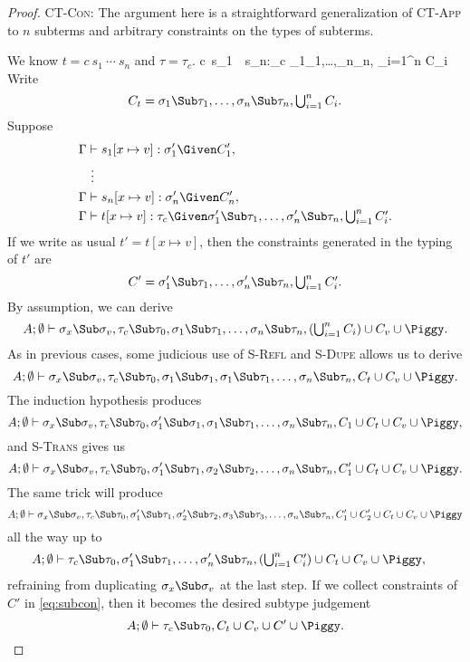 \documentclass{amsart}
\theoremstyle{definition}
\begin{document}
\begin{proof}
\Case\textsc{CT-Con}: The argument here is a straightforward
generalization of \hbox{\textsc{CT-App}} to $n$ subterms and
arbitrary constraints on the types of subterms.

We know $t=c~s_1~\cdots~s_n$ and $\tau=\tau_c$.
%
{\Gamma\vdash c~s_1~\cdots~s_n:\tau_c\Given
\sigma_1\Sub\tau_1,\ldots,\sigma_n\Sub\tau_n,
{\textstyle\bigcup_{i=1}^n C_i}
}
%
Write
\[
C_t=\sigma_1\Sub\tau_1,\ldots,\sigma_n\Sub\tau_n,
{\textstyle\bigcup_{i=1}^n C_i}.
\]
Suppose
\begin{align*}
\Gamma&\vdash s_1[x\mapsto v]:\sigma_1'\Given C_1',\\
&~\vdots\\
\Gamma&\vdash s_n[x\mapsto v]:\sigma_n'\Given C_n',\\
\Gamma&\vdash t[x\mapsto v]:\tau_c\Given
\sigma_1'\Sub\tau_1,\ldots,\sigma_n'\Sub\tau_n,
{\textstyle\bigcup_{i=1}^n C_i'}.
\end{align*}
If we write as usual $t'=t[x\mapsto v]$, then the constraints
generated in the typing of $t'$ are
\[
C'=\sigma_1'\Sub\tau_1,\ldots,\sigma_n'\Sub\tau_n,
{\textstyle\bigcup_{i=1}^n C_i'}.
\]
By assumption, we can derive
\[
A;\emptyset\vdash \sigma_x\Sub\sigma_v,\tau_c\Sub\tau_0,
\sigma_1\Sub\tau_1,\ldots,\sigma_n\Sub\tau_n,
({\textstyle\bigcup_{i=1}^n C_i})
\cup C_v\cup\Piggy.
\]
As in previous cases, some judicious use of \textsc{S-Refl} and
\textsc{S-Dupe} allows us to derive
\[
A;\emptyset\vdash \sigma_x\Sub\sigma_v,\tau_c\Sub\tau_0,
\sigma_1\Sub\sigma_1,
\sigma_1\Sub\tau_1,\ldots,\sigma_n\Sub\tau_n,
C_t\cup C_v\cup\Piggy.
\]
The induction hypothesis produces
\[
A;\emptyset\vdash \sigma_x\Sub\sigma_v,\tau_c\Sub\tau_0,
\sigma_1'\Sub\sigma_1,
\sigma_1\Sub\tau_1,\ldots,\sigma_n\Sub\tau_n,
C_1\cup C_t\cup C_v\cup\Piggy,
\]
and \textsc{S-Trans} gives us
\[
A;\emptyset\vdash \sigma_x\Sub\sigma_v,\tau_c\Sub\tau_0,
\sigma_1'\Sub\tau_1,
\sigma_2\Sub\tau_2,\ldots,\sigma_n\Sub\tau_n,
C_1'\cup
C_t\cup C_v\cup
\Piggy.
\]
The same trick will produce
\[
A;\emptyset\vdash \sigma_x\Sub\sigma_v,\tau_c\Sub\tau_0,
\sigma_1'\Sub\tau_1,
\sigma_2'\Sub\tau_2,
\sigma_3\Sub\tau_3,
\ldots,\sigma_n\Sub\tau_n,
C_1'\cup C_2'\cup
C_t\cup C_v\cup\Piggy
\]
all the way up to
\begin{align}
A;\emptyset&\vdash \tau_c\Sub\tau_0,
\sigma_1'\Sub\tau_1,\ldots,\sigma_n'\Sub\tau_n,
({\textstyle\bigcup_{i=1}^nC_i'})\cup
C_t\cup C_v\cup\Piggy,
\label{eq:subcon}
\end{align}
refraining from duplicating $\sigma_x\Sub\sigma_v$ at the last
step. If we collect constraints of $C'$ in \eqref{eq:subcon},
then it becomes the desired subtype judgement
\[
A;\emptyset\vdash \tau_c\Sub\tau_0,
C_t\cup C_v\cup C'\cup\Piggy.
\]
\end{proof}
\end{document}
